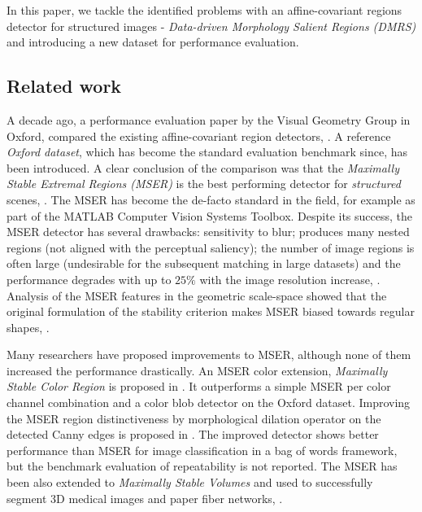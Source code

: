 \documentclass{article}
\begin{document}
In this paper, we tackle the identified problems with an affine-covariant regions detector for structured images - {\em Data-driven Morphology Salient Regions (DMRS)} and introducing a new dataset for performance evaluation.

\subsection{Related work}
\label{ssec:relwork}

A decade ago, a performance evaluation paper by the Visual Geometry Group in Oxford, compared the existing affine-covariant region detectors, \cite{Mikolajczyk:2005}. A reference  {\em Oxford dataset}, which has become the standard evaluation benchmark since, has been introduced. A clear conclusion of the comparison was that the {\em  Maximally Stable Extremal Regions (MSER)} is the best performing detector for {\em structured} scenes, \cite{Matas2002BMVC}. The MSER has become the de-facto standard in the field, for example as part of the MATLAB Computer Vision Systems Toolbox. 
Despite its success, the MSER detector has several drawbacks: sensitivity to blur; produces many nested regions (not aligned with the perceptual saliency); the number of image regions is often large (undesirable for the subsequent matching in large datasets) and the performance degrades with up to $25\%$ with the image resolution increase, \cite{CorRos2013}. 
Analysis of the MSER features in the geometric scale-space showed that the original formulation of the stability criterion makes MSER biased towards regular shapes, \cite{Kimmel11}.

Many researchers have proposed improvements to MSER, although none of them increased the performance drastically. An MSER color extension, {\em Maximally Stable Color Region} is proposed in \cite{Forssen07}.  It outperforms a simple MSER per color channel combination and a color blob detector on the Oxford dataset. 
Improving the MSER region distinctiveness by morphological dilation operator on the detected Canny edges is proposed in \cite{Wang14}. The improved detector shows better performance than MSER for image classification in a bag of words framework, but the benchmark evaluation of repeatability is not reported. 
The MSER has been also extended to {\em Maximally Stable Volumes} and used to successfully segment 3D medical images and paper fiber networks, \cite{DonoserB06}.
\end{document}
